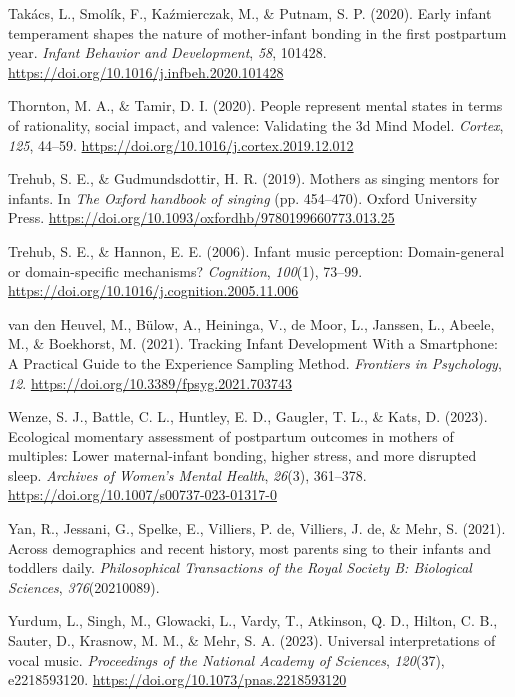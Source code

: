 \documentclass[
]{article}
\newlength{\cslhangindent}
\newenvironment{CSLReferences}[2] %
 {\begin{list}{}{%
  \setlength{\itemindent}{0pt}
  \setlength{\leftmargin}{0pt}
  \setlength{\parsep}{0pt}
  \ifodd #1
   \setlength{\leftmargin}{\cslhangindent}
   \setlength{\itemindent}{-1\cslhangindent}
  \fi
  \setlength{\itemsep}{#2\baselineskip}}}
 {\end{list}}
\begin{document}
\begin{CSLReferences}{1}{0}
Takács, L., Smolík, F., Kaźmierczak, M., \& Putnam, S. P. (2020). Early
infant temperament shapes the nature of mother-infant bonding in the
first postpartum year. \emph{Infant Behavior and Development},
\emph{58}, 101428. \url{https://doi.org/10.1016/j.infbeh.2020.101428}

Thornton, M. A., \& Tamir, D. I. (2020). People represent mental states
in terms of rationality, social impact, and valence: {Validating} the 3d
{Mind Model}. \emph{Cortex}, \emph{125}, 44--59.
\url{https://doi.org/10.1016/j.cortex.2019.12.012}

Trehub, S. E., \& Gudmundsdottir, H. R. (2019). Mothers as singing
mentors for infants. In \emph{The {Oxford} handbook of singing} (pp.
454--470). Oxford University Press.
\url{https://doi.org/10.1093/oxfordhb/9780199660773.013.25}

Trehub, S. E., \& Hannon, E. E. (2006). Infant music perception:
{Domain-general} or domain-specific mechanisms? \emph{Cognition},
\emph{100}(1), 73--99.
\url{https://doi.org/10.1016/j.cognition.2005.11.006}

van den Heuvel, M., Bülow, A., Heininga, V., de Moor, L., Janssen, L.,
Abeele, M., \& Boekhorst, M. (2021). Tracking {Infant Development With}
a {Smartphone}: {A Practical Guide} to the {Experience Sampling Method}.
\emph{Frontiers in Psychology}, \emph{12}.
\url{https://doi.org/10.3389/fpsyg.2021.703743}

Wenze, S. J., Battle, C. L., Huntley, E. D., Gaugler, T. L., \& Kats, D.
(2023). Ecological momentary assessment of postpartum outcomes in
mothers of multiples: Lower maternal-infant bonding, higher stress, and
more disrupted sleep. \emph{Archives of Women's Mental Health},
\emph{26}(3), 361--378. \url{https://doi.org/10.1007/s00737-023-01317-0}

Yan, R., Jessani, G., Spelke, E., Villiers, P. de, Villiers, J. de, \&
Mehr, S. (2021). Across demographics and recent history, most parents
sing to their infants and toddlers daily. \emph{Philosophical
Transactions of the Royal Society B: Biological Sciences},
\emph{376}(20210089).

Yurdum, L., Singh, M., Glowacki, L., Vardy, T., Atkinson, Q. D., Hilton,
C. B., Sauter, D., Krasnow, M. M., \& Mehr, S. A. (2023). Universal
interpretations of vocal music. \emph{Proceedings of the National
Academy of Sciences}, \emph{120}(37), e2218593120.
\url{https://doi.org/10.1073/pnas.2218593120}

\end{CSLReferences}
\end{document}

